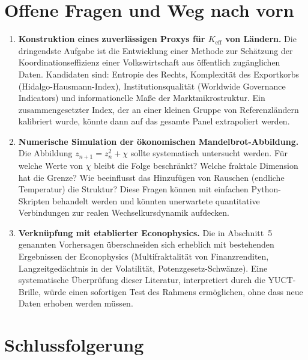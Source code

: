 \documentclass[12pt,a4paper]{article}
\theoremstyle{remark}
\begin{document}
	\section{Offene Fragen und Weg nach vorn}
	
	\begin{enumerate}[label=(\roman*)]
		\item \textbf{Konstruktion eines zuverlässigen Proxys für \(K_{\mathrm{eff}}\) von Ländern.} Die dringendste Aufgabe ist die Entwicklung einer Methode zur Schätzung der Koordinationseffizienz einer Volkswirtschaft aus öffentlich zugänglichen Daten. Kandidaten sind: Entropie des Rechts, Komplexität des Exportkorbs (Hidalgo-Hausmann-Index), Institutionsqualität (Worldwide Governance Indicators) und informationelle Maße der Marktmikrostruktur. Ein zusammengesetzter Index, der an einer kleinen Gruppe von Referenzländern kalibriert wurde, könnte dann auf das gesamte Panel extrapoliert werden.
		
		\item \textbf{Numerische Simulation der ökonomischen Mandelbrot-Abbildung.} Die Abbildung \(z_{n+1} = z_n^2 + \chi\) sollte systematisch untersucht werden. Für welche Werte von \(\chi\) bleibt die Folge beschränkt? Welche fraktale Dimension hat die Grenze? Wie beeinflusst das Hinzufügen von Rauschen (endliche Temperatur) die Struktur? Diese Fragen können mit einfachen Python-Skripten behandelt werden und könnten unerwartete quantitative Verbindungen zur realen Wechselkursdynamik aufdecken.
		
		\item \textbf{Verknüpfung mit etablierter Econophysics.} Die in Abschnitt~5 genannten Vorhersagen überschneiden sich erheblich mit bestehenden Ergebnissen der Econophysics (Multifraktalität von Finanzrenditen, Langzeitgedächtnis in der Volatilität, Potenzgesetz-Schwänze). Eine systematische Überprüfung dieser Literatur, interpretiert durch die YUCT-Brille, würde einen sofortigen Test des Rahmens ermöglichen, ohne dass neue Daten erhoben werden müssen.
	\end{enumerate}
	
	\section{Schlussfolgerung}
	
\end{document}

